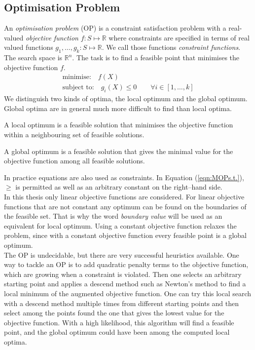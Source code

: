 \subsection{Optimisation Problem}
An \emph{optimisation problem} (OP) is a constraint satisfaction problem with a real-valued \emph{objective function} $f:S\mapsto \mathbb{R}$ where constraints are specified in terms of real valued functions $g_1,\dots,g_k:S\mapsto\mathbb{R}$. We call those functions \emph{constraint functions}. The search space is $\mathbb{R}^n$. The task is to find a feasible point that minimises the objective function $f$.
\begin{eqnarray}
\text{minimise:} \quad f(X)\\
\text{subject to:} \quad g_i(X)\leq 0 \qquad \forall i\in\left[1,\dots ,k\right] \label{eqn:MOPs.t.}
\end{eqnarray}
We distinguish two kinds of optima, the local optimum and the global optimum. Global optima are in general much more difficult to find than local optima.
\begin{definition}
A local optimum is a feasible solution that minimises the objective function within a neighbouring set of feasible solutions.
\end{definition}
\begin{definition}
A global optimum is a feasible solution that gives the minimal value for the objective function among all feasible solutions.
\end{definition}
In practice equations are also used as constraints. In Equation (\ref{eqn:MOPs.t.}), $\geq$ is permitted as well as an arbitrary constant on the right--hand side. \\
In this thesis only linear objective functions are considered. For linear objective functions that are not constant any optimum can be found on the boundaries of the feasible set. That is why the word \emph{boundary value} will be used as an equivalent for local optimum. Using a constant objective function relaxes the problem, since with a constant objective function every feasible point is a global optimum.\\
The OP is undecidable, but there are very successful heuristics available. One way to tackle an OP is to add quadratic penalty terms to the objective function, which are growing when a constraint is violated. Then one selects an arbitrary starting point and applies a descend method such as Newton's method to find a local minimum of the augmented objective function. One can try this local search with a descend method multiple times from different starting points and then select among the points found the one that gives the lowest value for the objective function. With a high likelihood, this algorithm will find a feasible point, and the global optimum could have been among the computed local optima.
